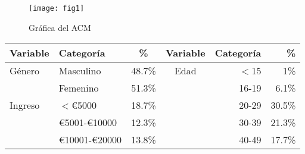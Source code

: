 \documentclass[12pt]{beamer}
\begin{document}
\begin{figure}[htb]
	\centering
	\texttt{[image: fig1]}
	\caption{Gráfica del ACM}
	\end{figure}
\clearpage
\begin{flushleft}
	\begin{tabular*}{0.978\textwidth}{ |l  l  c  c  r  r |}
		\hline
		{\scriptsize Variable} & {\scriptsize Categoría} & {\scriptsize \hspace{1.5cm}\%} & {\scriptsize Variable} & {\scriptsize Categoría} & {\scriptsize \%} \\ \hline
		{\scriptsize Género} & {\tiny Masculino} & {\scriptsize 48.7\%} & {\scriptsize Edad} & {\scriptsize $<$15} & {\scriptsize 1\%}\\
		 {\tiny } & {\tiny Femenino} & {\scriptsize 51.3\%} & {\scriptsize } & {\scriptsize 16-19} & {\scriptsize 6.1\%}  \\
		 {\scriptsize Ingreso} & {\scriptsize $<$\euro5000} & {\scriptsize 18.7\%} & {\scriptsize } & {\scriptsize 20-29} & {\scriptsize 30.5\%}\\ 
		 {\tiny } & {\scriptsize \euro5001-\euro10000} & {\scriptsize 12.3\%} &  {\scriptsize } & {\scriptsize 30-39} & {\scriptsize 21.3\%} \\ 
		 {\tiny } & {\scriptsize \euro10001-\euro20000} & {\scriptsize 13.8\%} & {\scriptsize } & {\scriptsize 40-49} & {\scriptsize 17.7\%} \\ 
		 

\end{tabular*}
\end{flushleft}
\end{document}
